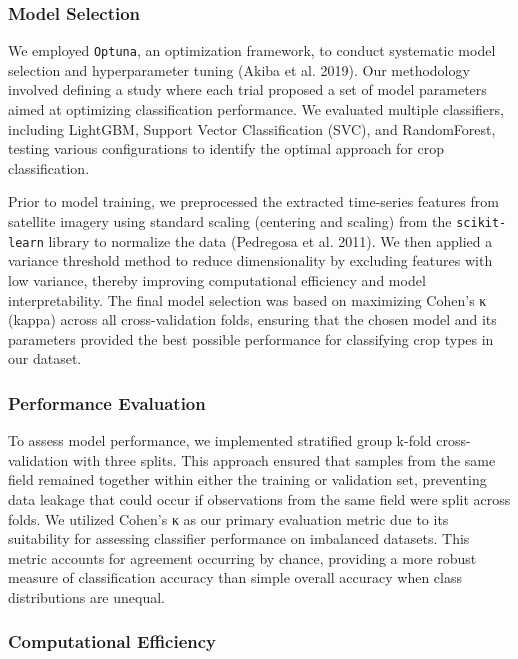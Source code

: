 \documentclass[
  journal,
  twocolumn]{IEEEtran}
\begin{document}
\hypertarget{model-selection}{%
\subsubsection{Model Selection}\label{model-selection}}

We employed \texttt{Optuna}, an optimization framework, to conduct
systematic model selection and hyperparameter tuning (Akiba et al.
2019). Our methodology involved defining a study where each trial
proposed a set of model parameters aimed at optimizing classification
performance. We evaluated multiple classifiers, including LightGBM,
Support Vector Classification (SVC), and RandomForest, testing various
configurations to identify the optimal approach for crop classification.

Prior to model training, we preprocessed the extracted time-series
features from satellite imagery using standard scaling (centering and
scaling) from the \texttt{scikit-learn} library to normalize the data
(Pedregosa et al. 2011). We then applied a variance threshold method to
reduce dimensionality by excluding features with low variance, thereby
improving computational efficiency and model interpretability. The final
model selection was based on maximizing Cohen's κ (kappa) across all
cross-validation folds, ensuring that the chosen model and its
parameters provided the best possible performance for classifying crop
types in our dataset.

\hypertarget{performance-evaluation}{%
\subsubsection{Performance Evaluation}\label{performance-evaluation}}

To assess model performance, we implemented stratified group k-fold
cross-validation with three splits. This approach ensured that samples
from the same field remained together within either the training or
validation set, preventing data leakage that could occur if observations
from the same field were split across folds. We utilized Cohen's κ as
our primary evaluation metric due to its suitability for assessing
classifier performance on imbalanced datasets. This metric accounts for
agreement occurring by chance, providing a more robust measure of
classification accuracy than simple overall accuracy when class
distributions are unequal.

\hypertarget{computational-efficiency}{%
\subsubsection{Computational
Efficiency}\label{computational-efficiency}}
\end{document}
